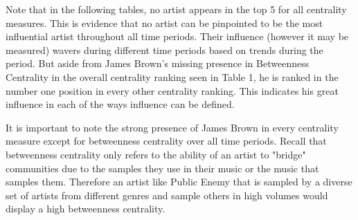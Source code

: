 \documentclass[pageno]{jpaper}
\begin{document}
Note that in the following tables, no artist appears in the top 5 for all centrality measures. This is evidence that no artist can be pinpointed to be the most influential artist throughout all time periods. Their influence (however it may be measured) wavers during different time periods based on trends during the period. But aside from James Brown's missing presence in Betweenness Centrality in the overall centrality ranking seen in Table 1, he is ranked in the number one position in every other centrality ranking. This indicates his great influence in each of the ways influence can be defined. 
\begin{table}[H]
\caption{Top Artists by Centralities (All Time Periods)}
\label{table:table1}
\end{table}
It is important to note the strong presence of James Brown in every centrality measure except for betweenness centrality over all time periods. Recall that betweenness centrality only refers to the ability of an artist to "bridge" communities due to the samples they use in their music or the music that samples them. Therefore an artist like Public Enemy that is sampled by a diverse set of artists from different genres and sample others in high volumes would display a high betweenness centrality.
\end{document}
